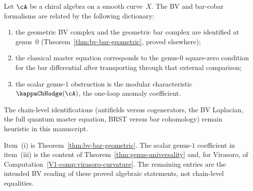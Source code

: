 \begin{remark}
\label{rem:bv-bar-bridge}
Let $\cA$ be a chiral algebra on a smooth curve~$X$. The BV and
bar-cobar formalisms are related by the following dictionary:
\begin{enumerate}[label=\textup{(\roman*)}]
\item the geometric BV complex and the geometric bar complex are
 identified at genus~$0$
 \textup{(}Theorem~\textup{\ref{thm:bv-bar-geometric}}, proved
 elsewhere\textup{)};
\item the classical master equation corresponds to the
 genus-$0$ square-zero condition for the bar differential after
 transporting through that external comparison;
\item the scalar genus-$1$ obstruction is the modular characteristic
 $\kappaChHodge(\cA)$, the one-loop anomaly
 coefficient.
\end{enumerate}
The chain-level identifications (antifields versus
cogenerators, the BV Laplacian, the full quantum master equation,
BRST versus bar cohomology) remain heuristic in this manuscript.

Item~\textup{(i)} is Theorem~\ref{thm:bv-bar-geometric}. The scalar
genus-$1$ coefficient in item~\textup{(iii)} is the content of
Theorem~\ref{thm:genus-universality} and, for Virasoro, of
Computation~\ref{V1-comp:virasoro-curvature}. The remaining entries are
the intended BV reading of these proved algebraic statements, not
chain-level equalities.
\end{remark}

